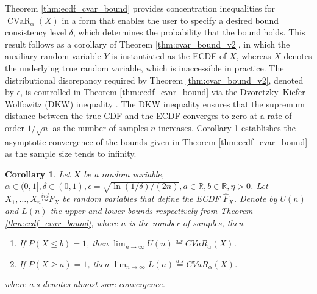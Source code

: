 \documentclass[letterpaper]{article} %
\newtheorem{corollary}[theorem]{Corollary}
\newcommand{\KP}[1]{\textcolor{red}{#1}}
\begin{document}
Theorem \ref{thm:ecdf_cvar_bound} provides concentration inequalities for $\operatorname{CVaR}_\alpha(X)$ in a form that enables the user to specify a desired bound consistency level $\delta$, which determines the probability that the bound holds. This result follows as a corollary of Theorem \ref{thm:cvar_bound_v2}, in which the auxiliary random variable $Y$ is instantiated as the ECDF of $X$, whereas $X$ denotes the underlying true random variable, which is inaccessible in practice. The distributional discrepancy required by Theorem \ref{thm:cvar_bound_v2}, denoted by $\epsilon$, is controlled in Theorem \ref{thm:ecdf_cvar_bound} via the Dvoretzky–Kiefer–Wolfowitz (DKW) inequality \cite{DKW_inequality}. The DKW inequality ensures that the supremum distance between the true CDF and the ECDF converges to zero at a rate of order $1/\sqrt{n}$ as the number of samples $n$ increases. Corollary \ref{thm:x_concentration_bound_asymptotic_convergence} establishes the asymptotic convergence of the bounds given in Theorem \ref{thm:ecdf_cvar_bound} as the sample size tends to infinity.
\begin{corollary}\label{thm:x_concentration_bound_asymptotic_convergence}
	Let $X$ be a random variable, $\alpha\in (0, 1],\delta \in (0, 1), \epsilon=\sqrt{\ln(1/\delta)/(2n)}, a\in \mathbb{R}, b\in \mathbb{R}, \eta>0$. Let $X_1, \dots, X_n \overset{iid}{\sim} F_X$ be random variables that define the ECDF $\hat{F}_X$. Denote by $U(n)$ and $L(n)$ the upper and lower bounds respectively from Theorem \ref{thm:ecdf_cvar_bound}, where $n$ is the number of samples, then 
	\begin{enumerate}
		\item If $P(X\leq b)=1$, then $\lim_{n\rightarrow \infty} U(n)\overset{a.s}{=}CVaR_\alpha(X)$.
		\item If $P(X\geq a)=1$, then $\lim_{n\rightarrow \infty} L(n)\overset{a.s}{=}CVaR_\alpha(X)$.
	\end{enumerate}
	where a.s denotes almost sure convergence.
\end{corollary}
\end{document}
